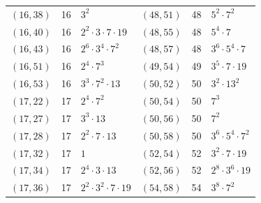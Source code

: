 \documentclass[11pt]{article}
\begin{document}
\begin{longtable}{@{}lrl@{\qquad}lrl@{}}
$(16,38)$ & 16 & $3^{2}$ & $(48,51)$ & 48 & $5^{2}\cdot 7^{2}$\\
$(16,40)$ & 16 & $2^{2}\cdot 3\cdot 7\cdot 19$ & $(48,55)$ & 48 & $5^{4}\cdot 7$\\
$(16,43)$ & 16 & $2^{6}\cdot 3^{4}\cdot 7^{2}$ & $(48,57)$ & 48 & $3^{6}\cdot 5^{4}\cdot 7$\\
$(16,51)$ & 16 & $2^{4}\cdot 7^{3}$ & $(49,54)$ & 49 & $3^{5}\cdot 7\cdot 19$\\
$(16,53)$ & 16 & $3^{3}\cdot 7^{2}\cdot 13$ & $(50,52)$ & 50 & $3^{2}\cdot 13^{2}$\\
$(17,22)$ & 17 & $2^{4}\cdot 7^{2}$ & $(50,54)$ & 50 & $7^{3}$\\
$(17,27)$ & 17 & $3^{3}\cdot 13$ & $(50,56)$ & 50 & $7^{2}$\\
$(17,28)$ & 17 & $2^{2}\cdot 7\cdot 13$ & $(50,58)$ & 50 & $3^{6}\cdot 5^{4}\cdot 7^{2}$\\
$(17,32)$ & 17 & $1$ & $(52,54)$ & 52 & $3^{2}\cdot 7\cdot 19$\\
$(17,34)$ & 17 & $2^{4}\cdot 3\cdot 13$ & $(52,56)$ & 52 & $2^{8}\cdot 3^{6}\cdot 19$\\
$(17,36)$ & 17 & $2^{2}\cdot 3^{2}\cdot 7\cdot 19$ & $(54,58)$ & 54 & $3^{8}\cdot 7^{2}$\\
\end{longtable}
\endgroup
\end{document}
